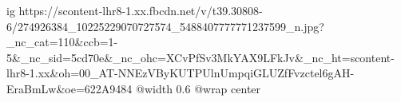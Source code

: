  
 
 
 
 

\ifcmt
  ig https://scontent-lhr8-1.xx.fbcdn.net/v/t39.30808-6/274926384_10225229070727574_5488407777771237599_n.jpg?_nc_cat=110&ccb=1-5&_nc_sid=5cd70e&_nc_ohc=XCvPfSv3MkYAX9LFkJv&_nc_ht=scontent-lhr8-1.xx&oh=00_AT-NNEzVByKUTPUlnUmpqiGLUZfFvzctel6gAH-EraBmLw&oe=622A9484
  @width 0.6
	@wrap center
\fi
